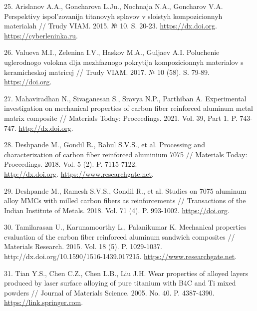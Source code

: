 \begin{references}
25. Arislanov A.A., Goncharova L.Ju., Nochnaja N.A., Goncharov
V.A. Perspektivy ispol'zovanija titan\-ovyh splavov v sloistyh
kompozicionnyh materialah // Trudy VIAM. 2015. №
10. S. 20-23. \href{https://dx.doi.org/10.18577/2307-6046-2015-0-10-4-4}{https://dx.doi.org}. \href{https://cyberleninka.ru/article/n/perspektivy-ispolzovaniya-titanovyh-splavov-v-sloistyh-kompozitsionnyh-materialah/viewer}{https://cyberleninka.ru}.

26. Valueva M.I., Zelenina I.V., Haskov M.A., Guljaev A.I. Poluchenie
uglerodnogo volokna dlja mezhfaz\-nogo pokrytija kompozicionnyh
materialov s keramicheskoj matricej // Trudy VIAM. 2017. № 10
(58). S. 79-89. \href{https://doi.org/10.18577/2307-6046-2017-0-10-9-9}{https://doi.org}.

27. Mahaviradhan N., Sivaganesan S., Sravya N.P., Parthiban
A. Experimental investigation on mechanical properties of carbon fiber
reinforced aluminum metal matrix composite // Materials Today:
Proceedings. 2021. Vol. 39, Part
1. P. 743-747. \href{http://dx.doi.org/10.1016/j.matpr.2020.09.443}{http://dx.doi.org}.

28. Deshpande M., Gondil R., Rahul S.V.S., et al. Processing and
characterization of carbon fiber reinforced aluminium 7075 //
Materials Today: Proceedings. 2018. Vol. 5
(2). P. 7115-7122. \\\href{http://dx.doi.org/10.1016/j.matpr.2017.11.376}{http://dx.doi.org}. \href{https://www.researchgate.net/publication/312780136_Processing_of_Carbon_fiber_reinforced_Aluminium_7075_metal_matrix_composite}{https://www.researchgate.net}.

29. Deshpande M., Ramesh S.V.S., Gondil R., et al. Studies on 7075
aluminum alloy MMCs with milled carbon fibers as reinforcements //
Transactions of the Indian Institute of Metals. 2018. Vol. 71
(4). P. 993-1002. \href{https://doi.org/10.1007/s12666-017-1233-4}{https://doi.org}.

30. Tamilarasan U., Karunamoorthy L., Palanikumar K. Mechanical
properties evaluation of the carbon fiber reinforced aluminum sandwich
composites // Materials Research. 2015. Vol. 18
(5). P. 1029-1037. http://dx.doi.org/10.1590/1516-1439.017215. \href{https://www.researchgate.net/publication/283618484_Mechanical_Properties_Evaluation_of_the_Carbon_Fibre_Reinforced_Aluminium_Sandwich_Composites}{https://www.researchgate.net}.

31. Tian Y.S., Chen C.Z., Chen L.B., Liu J.H. Wear properties of
alloyed layers produced by laser surface alloying of pure titanium
with B4C and Ti mixed powders // Journal of Materials
Science. 2005. No. 40. P. 4387-4390. \href{https://link.springer.com/article/10.1007/s10853-005-0736-2}{https://link.springer.com}.


\end{references}

